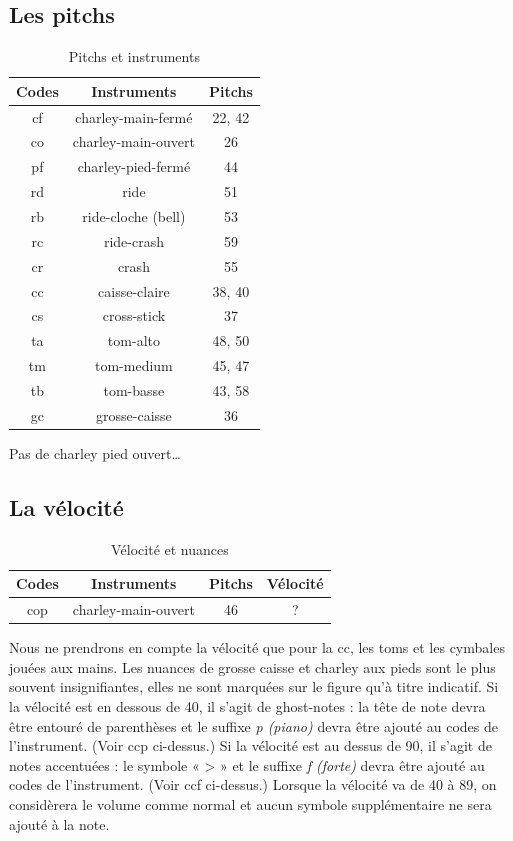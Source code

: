 \subsection*{Les pitchs}
\begin{table}[h]
	\centering
	\begin{tabular}{|c|c|c|} \hline
		Codes & Instruments & Pitchs \\ \hline
		cf & charley-main-fermé & 22, 42 \\
		co & charley-main-ouvert & 26 \\
		pf & charley-pied-fermé & 44 \\
		rd & ride & 51 \\
		rb & ride-cloche (bell) & 53 \\
		rc & ride-crash & 59 \\
		cr & crash & 55 \\
		cc & caisse-claire & 38, 40 \\
		cs & cross-stick & 37 \\
		ta & tom-alto & 48, 50 \\
		tm & tom-medium & 45, 47 \\
		tb & tom-basse & 43, 58 \\
		gc & grosse-caisse & 36 \\ \hline
	\end{tabular}
	\caption{Pitchs et instruments}
	\label{Pitchs et instruments}
\end{table}
Pas de charley pied ouvert…
\subsection*{La vélocité}
\begin{table}[h]
	\centering
	\begin{tabular}{|c|c|c|c|} \hline
		Codes & Instruments & Pitchs & Vélocité \\ \hline
		cop & charley-main-ouvert & 46 & ? \\ \hline
	\end{tabular}
	\caption{Vélocité et nuances}
\end{table}
Nous ne prendrons en compte la vélocité que pour la cc, les toms et les cymbales jouées aux mains. Les nuances de grosse caisse et charley aux pieds sont le plus souvent insignifiantes, elles ne sont marquées sur le figure qu’à titre indicatif.
Si la vélocité est en dessous de 40, il s’agit de ghost-notes : la tête de note devra être entouré de parenthèses et le suffixe \textit{p (piano)} devra être ajouté au codes de l’instrument. (Voir ccp ci-dessus.)
Si la vélocité est au dessus de 90, il s’agit de notes accentuées : le symbole « > » et le suffixe \textit{f (forte)} devra être ajouté au codes de l’instrument. (Voir ccf ci-dessus.)
Lorsque la vélocité va de 40 à 89, on considèrera le volume comme normal et aucun symbole supplémentaire ne sera ajouté à la note.\\\\

